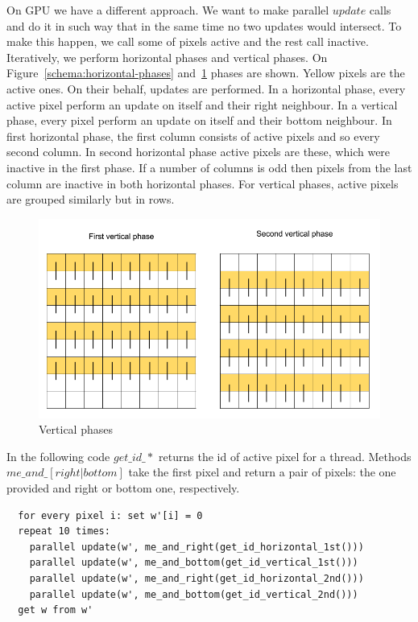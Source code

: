 \documentclass[a4paper,12pt]{article}
\begin{document}
On GPU we have a different approach. We want to make parallel $update$ calls and
do it in such way that in the same time no two updates would intersect. To make
this happen, we call some of pixels active and the rest call inactive.
Iteratively, we perform horizontal phases and vertical phases. On
Figure~\ref{schema:horizontal-phases} and~\ref{schema:vertical-phases} phases are
shown. Yellow pixels are the active ones. On their behalf, updates are
performed. In a horizontal phase, every active pixel perform an update on
itself and their right neighbour. In a vertical phase, every pixel perform
an update on itself and their bottom neighbour. In first horizontal phase,
the first column consists of active pixels and so every second column. In second
horizontal phase active pixels are these, which were inactive in the first
phase. If a number of columns is odd then pixels from the last column are inactive
in both horizontal phases. For vertical phases, active pixels are grouped
similarly but in rows.
\begin{figure}[ht]
  \centering
    \includegraphics[width=1.0\textwidth]{../../images/vertical-phases.png}
  \caption{Vertical phases}
  \label{schema:vertical-phases}
\end{figure}
In the following code $get\_id\_*$ returns the id of active pixel for a thread.
Methods $me\_and\_[right|bottom]$ take the first pixel and return a pair of pixels:
the one provided and right or bottom one, respectively.
\begin{lstlisting}
  for every pixel i: set w'[i] = 0
  repeat 10 times:
    parallel update(w', me_and_right(get_id_horizontal_1st()))
    parallel update(w', me_and_bottom(get_id_vertical_1st()))
    parallel update(w', me_and_right(get_id_horizontal_2nd()))
    parallel update(w', me_and_bottom(get_id_vertical_2nd()))
  get w from w'
\end{lstlisting}
\end{document}

